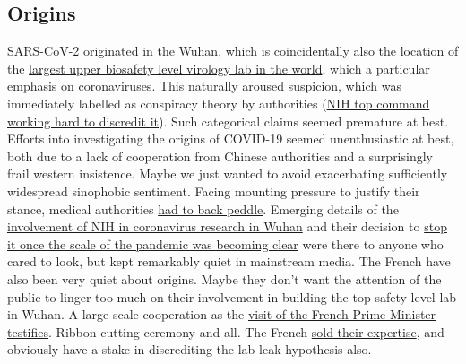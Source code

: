 \documentclass[11pt,a4paper]{article}
\begin{document}
\subsection*{Origins}

SARS-CoV-2 originated in the Wuhan, which is coincidentally also the location of the \href{https://theconversation.com/fifty-nine-labs-around-world-handle-the-deadliest-pathogens-only-a-quarter-score-high-on-safety-161777}{largest upper biosafety level virology lab in the world}, which a particular emphasis on coronaviruses. This naturally aroused suspicion, which was immediately labelled as conspiracy theory by authorities (\href{https://nypost.com/2022/01/11/fauci-called-wuhan-lab-leak-theory-shiny-object-in-april-2020-email/}{NIH top command working hard to discredit it}). Such categorical claims seemed premature at best. Efforts into investigating the origins of COVID-19 seemed unenthusiastic at best, both due to a lack of cooperation from Chinese authorities and a surprisingly frail western insistence. Maybe we just wanted to avoid exacerbating sufficiently widespread sinophobic sentiment. Facing mounting pressure to justify their stance, medical authorities \href{https://www.theguardian.com/world/2021/jul/16/who-chief-says-push-to-discount-lab-leak-theory-was-premature}{had to back peddle}. Emerging details of the \href{https://www.vanityfair.com/news/2021/10/nih-admits-funding-risky-virus-research-in-wuhan}{involvement of NIH in coronavirus research in Wuhan} and their decision to \href{https://www.the-scientist.com/news-opinion/nih-cancels-funding-for-bat-coronavirus-research-project-67486}{stop it once the scale of the pandemic was becoming clear} were there to anyone who cared to look, but kept remarkably quiet in mainstream media. The French have also been very quiet about origins. Maybe they don't want the attention of the public to linger too much on their involvement in building the top safety level lab in Wuhan. A large scale cooperation as the \href{http://english.whiov.cas.cn/ne/201802/t20180208_189991.html}{visit of the French Prime Minister testifies}. Ribbon cutting ceremony and all. The French \href{https://www.challenges.fr/entreprise/sante-et-pharmacie/revelations-l-histoire-secrete-du-laboratoire-p4-de-wuhan-vendu-par-la-france-a-la-chine_707425}{sold their expertise}, and obviously have a stake in discrediting the lab leak hypothesis also. 
\end{document}
